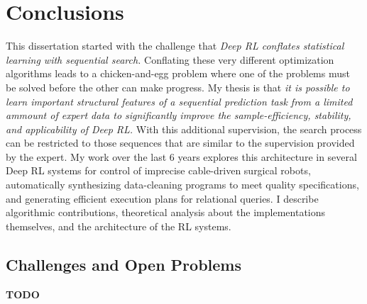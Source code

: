 \chapter{Conclusions}
This dissertation started with the challenge that \emph{Deep RL conflates statistical learning with sequential search.} Conflating these very different optimization algorithms leads to a chicken-and-egg problem where one of the problems must be solved before the other can make progress. My thesis is that \emph{it is possible to learn important structural features of a sequential prediction task from a limited ammount of expert data to significantly improve the sample-efficiency, stability, and applicability of Deep RL.} 
With this additional supervision, the search process can be restricted to those sequences that are similar to the supervision provided by the expert.
My work over the last 6 years explores this architecture in several Deep RL systems for control of imprecise cable-driven surgical robots, automatically synthesizing data-cleaning programs to meet quality specifications, and generating efficient execution plans for relational queries. I describe algorithmic contributions, theoretical analysis about the implementations themselves, and the architecture of the RL systems.

\section{Challenges and Open Problems}
\textbf{TODO}